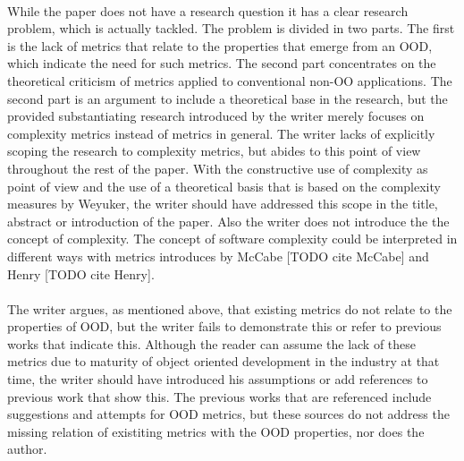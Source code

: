 \paragraph{}
While the paper does not have a research question it has a clear research problem, which is actually tackled.
The problem is divided in two parts. The first is the lack of metrics that relate to the properties that emerge from an
OOD, which indicate the need for such metrics. The second part concentrates on the theoretical criticism of metrics
applied to conventional non-OO applications. The second part is an argument to include a theoretical base in the
research, but the provided substantiating research introduced by the writer merely focuses on complexity metrics instead
of metrics in general. The writer lacks of explicitly scoping the research to complexity metrics, but abides to this
point of view throughout the rest of the paper. With the constructive use of complexity as point of view and the use of
a theoretical basis that is based on the complexity measures by Weyuker, the writer should have addressed this scope in
the title, abstract or introduction of the paper. Also the writer does not introduce the the concept of complexity. The concept of
software complexity could be interpreted in different ways with metrics introduces by McCabe [TODO cite McCabe]
and Henry [TODO cite Henry].

\paragraph{}
The writer argues, as mentioned above, that existing metrics do not relate to the properties of OOD, but the writer fails
to demonstrate this or refer to previous works that indicate this. Although the reader can assume the lack of these
metrics due to maturity of object oriented development in the industry at that time, the writer should have introduced
his assumptions or add references to previous work that show this. The previous works that are referenced include suggestions
and attempts for OOD metrics, but these sources do not address the missing relation of existiting metrics with the OOD
properties, nor does the author.

